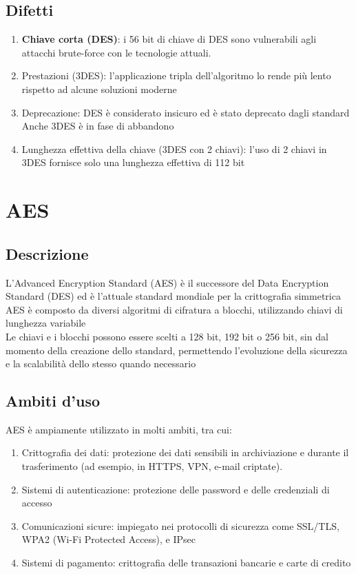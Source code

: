 \documentclass[10pt,oneside,a4paper]{article}
\begin{document}
\subsection{Difetti}
\begin{enumerate}
\item \textbf{Chiave corta (DES)}: i 56 bit di chiave di DES sono vulnerabili agli attacchi brute-force con le tecnologie attuali.
\item Prestazioni (3DES): l'applicazione tripla dell'algoritmo lo rende più lento rispetto ad alcune soluzioni moderne
\item Deprecazione: DES è considerato insicuro ed è stato deprecato dagli standard
Anche 3DES è in fase di abbandono
\item Lunghezza effettiva della chiave (3DES con 2 chiavi): l'uso di 2 chiavi in 3DES fornisce solo una lunghezza effettiva di 112 bit
\end{enumerate}
\section{AES}
\subsection{Descrizione}
L'Advanced Encryption Standard (AES) è il successore del Data Encryption Standard (DES) ed è l'attuale standard mondiale per la crittografia simmetrica\\
AES è composto da diversi algoritmi di cifratura a blocchi, utilizzando chiavi di lunghezza variabile\\
Le chiavi e i blocchi possono essere scelti a 128 bit, 192 bit o 256 bit, sin dal momento della creazione dello standard, permettendo l'evoluzione della sicurezza e la scalabilità dello stesso quando necessario
\subsection{Ambiti d'uso}
AES è ampiamente utilizzato in molti ambiti, tra cui:
\begin{enumerate}
\item Crittografia dei dati: protezione dei dati sensibili in archiviazione e durante il trasferimento (ad esempio, in HTTPS, VPN, e-mail criptate).
\item Sistemi di autenticazione: protezione delle password e delle credenziali di accesso
\item Comunicazioni sicure: impiegato nei protocolli di sicurezza come SSL/TLS, WPA2 (Wi-Fi Protected Access), e IPsec
\item Sistemi di pagamento: crittografia delle transazioni bancarie e carte di credito
\end{enumerate}
\end{document}
